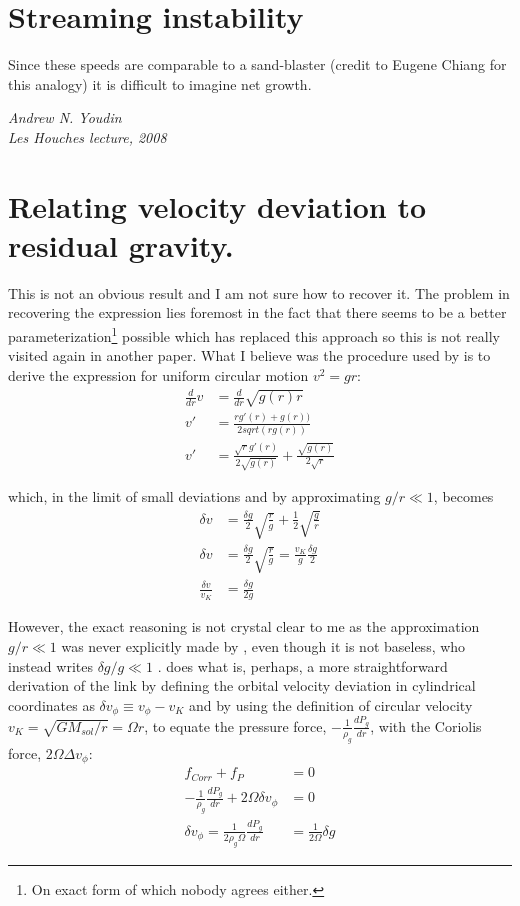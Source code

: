 \documentclass[12pt]{article}
\begin{document}
\section{Streaming instability}

\epigraph{\centering Since these speeds are comparable to a sand-blaster (credit to Eugene Chiang for this analogy) it is difficult to imagine net growth.}{\textit{Andrew N. Youdin \\ Les Houches lecture, 2008}}
\newpage




\newpage
\appendix

\section{Relating velocity deviation to residual gravity.}
\label{appendix:A}

This is not an obvious result and I am not sure how to recover it. The problem in recovering the expression lies foremost in the fact that there seems to be a better parameterization\footnote{On exact form of which nobody agrees either.} possible which has replaced this approach so this is not really visited again in another paper. What I believe was the procedure used by \citet{Weidenschilling77} is to derive the expression for uniform circular motion $v^2 = gr$:
\begin{align}
    \frac{d}{dr}v &= \frac{d}{dr}\sqrt{g(r)r} \\
    v' &= \frac{r g'(r) + g(r))}{2 sqrt(r g(r))} \\
    v' &= \frac{\sqrt{r} g'(r)}{2 \sqrt{g(r)}} + \frac{\sqrt{g(r)}}{2 \sqrt{r}} 
\end{align}

which, in the limit of small deviations and by approximating $g/r \ll 1$, becomes
\begin{align}
    \delta v &= \frac{\delta g}{2}\sqrt{\frac{r}{g}} + \frac{1}{2} \sqrt{\frac{g}{r}} \\
    \delta v &= \frac{\delta g}{2} \sqrt{\frac{r}{g}} = \frac{v_K}{g}\frac{\delta g}{2} \\
    \frac{\delta v }{v_K} &= \frac{\delta g}{2 g}
\end{align}

However, the exact reasoning is not crystal clear to me as the approximation $g/r \ll 1$ was never explicitly made by \citet{Weidenschilling77}, even though it is not baseless, who instead writes $\delta g/g \ll 1$ . \citet{LesHouches} does what is, perhaps, a more straightforward derivation of the link by defining the orbital velocity deviation in cylindrical coordinates as $\delta v_\phi \equiv v_\phi - v_K$ and by using the definition of circular velocity $v_K = \sqrt{GM_{sol}/r} = \Omega r$, to equate the pressure force, $-\frac{1}{\rho_g}\frac{dP_g}{dr}$, with the Coriolis force, $2\Omega\Delta v_\phi$:
\begin{align}
    \label{eq:simpledvdg}
    f_{Corr} + f_P &= 0 \\
    -\frac{1}{\rho_g}\frac{dP_g}{dr} + 2\Omega\delta v_\phi &= 0 \\
    \delta v_\phi = \frac{1}{2\rho_g\Omega}\frac{dP_g}{dr} &= \frac{1}{2\Omega}\delta g
\end{align}
\end{document}
